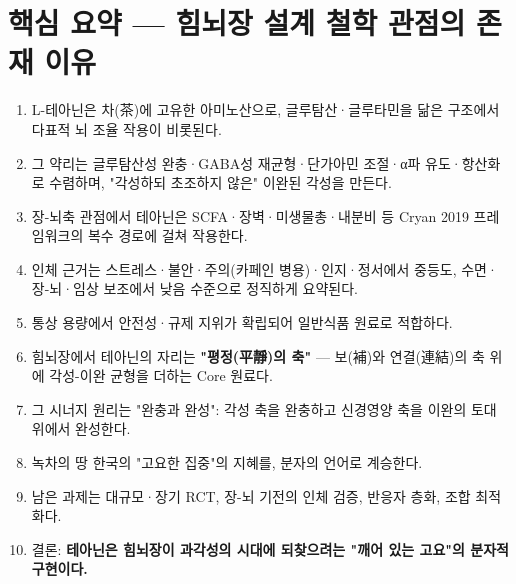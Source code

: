 \documentclass[11pt,oneside]{book}
\begin{document}
\section{핵심 요약 — 힘뇌장 설계 철학 관점의 존재 이유}
\begin{enumerate}[leftmargin=6mm,itemsep=1pt,topsep=2pt]
  \item L-테아닌은 차(茶)에 고유한 아미노산으로, 글루탐산·글루타민을 닮은 구조에서 다표적 뇌 조율 작용이 비롯된다.
  \item 그 약리는 글루탐산성 완충·GABA성 재균형·단가아민 조절·α파 유도·항산화로 수렴하며, "각성하되 초조하지 않은" 이완된 각성을 만든다.
  \item 장-뇌축 관점에서 테아닌은 SCFA·장벽·미생물총·내분비 등 Cryan 2019 프레임워크의 복수 경로에 걸쳐 작용한다.
  \item 인체 근거는 스트레스·불안·주의(카페인 병용)·인지·정서에서 중등도, 수면·장-뇌·임상 보조에서 낮음 수준으로 정직하게 요약된다.
  \item 통상 용량에서 안전성·규제 지위가 확립되어 일반식품 원료로 적합하다.
  \item 힘뇌장에서 테아닌의 자리는 \textbf{"평정(平靜)의 축"} — 보(補)와 연결(連結)의 축 위에 각성-이완 균형을 더하는 Core 원료다.
  \item 그 시너지 원리는 "완충과 완성": 각성 축을 완충하고 신경영양 축을 이완의 토대 위에서 완성한다.
  \item 녹차의 땅 한국의 "고요한 집중"의 지혜를, 분자의 언어로 계승한다.
  \item 남은 과제는 대규모·장기 RCT, 장-뇌 기전의 인체 검증, 반응자 층화, 조합 최적화다.
  \item 결론: \textbf{테아닌은 힘뇌장이 과각성의 시대에 되찾으려는 "깨어 있는 고요"의 분자적 구현이다.}
\end{enumerate}
\end{document}
